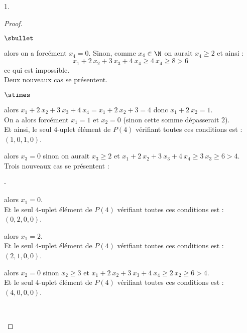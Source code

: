 \documentclass[11pt]{article}%
\begin{document}
\begin{noliste}{1.}
\begin{proof}
\begin{noliste}{$\sbullet$}
      \item {} alors on a forcément $x_4 =
        0$. Sinon, comme $x_4 \in \N$ on aurait $x_4 \geq 2$ et ainsi
        :
        \[
        x_1 + 2 \ x_2 + 3 \ x_3 + 4 \ x_4 \geq 4 \ x_4 \geq 8 > 6
        \]
        ce qui est impossible.\\
        Deux nouveaux cas se présentent.
        \begin{noliste}{$\stimes$}
        \item {} alors $x_1 + 2 \ x_2 + 3 \ x_3
          + 4 \ x_4 = x_1 + 2 \ x_2 + 3 = 4$ donc $x_1 + 2 \ x_2 = 1$.\\
          On a alors forcément $x_1 = 1$ et $x_2 = 0$ (sinon cette
          somme dépasserait $2$).\\
          Et ainsi, le seul $4$-uplet élément de $P(4)$ vérifiant
          toutes ces conditions est : $(1, 0, 1, 0)$.

        \item {} alors $x_3 = 0$ sinon on
          aurait $x_3 \geq 2$ et $x_1 + 2 \ x_2 + 3 \ x_3 + 4 \ x_4 
          \geq 3 \ x_3 \geq 6 > 4$.\\
          Trois nouveaux cas se présentent :
          \begin{noliste}{-}
          \item {} alors $x_1 = 0$.\\
            Et le seul $4$-uplet élément de $P(4)$ vérifiant toutes
            ces conditions est : $(0, 2, 0, 0)$.
          \item {} alors $x_1 = 2$.\\
            Et le seul $4$-uplet élément de $P(4)$ vérifiant toutes
            ces conditions est : $(2, 1, 0, 0)$.
          \item {} alors $x_2 = 0$
            sinon $x_2 \geq 3$ et $x_1 + 2 \ x_2 + 3 \ x_3 +
            4 \ x_4 \geq 2 \ x_2 \geq 6 > 4$.\\
            Et le seul $4$-uplet élément de $P(4)$ vérifiant toutes
            ces conditions est : $(4, 0, 0, 0)$.            
          \end{noliste}          
        \end{noliste}
        ~\\[-1.4cm] 
      \end{noliste}
    \end{proof}



\end{noliste}
\end{document}
